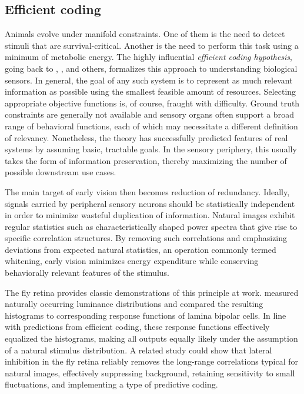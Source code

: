 \subsection{Efficient coding} Animals evolve under manifold constraints. One of them is the need to detect stimuli that are survival-critical. Another is the need to perform this task using a minimum of metabolic energy. The highly influential \textit{efficient coding hypothesis}, going back to \citet{Attneave:1954aa}, \citet{Barlow:1961aa}, and others, formalizes this approach to understanding biological sensors. In general, the goal of any such system is to represent as much relevant information as possible using the smallest feasible amount of resources. Selecting appropriate objective functions is, of course, fraught with difficulty. Ground truth constraints are generally not available and sensory organs often support a broad range of behavioral functions, each of which may necessitate a different definition of relevancy. Nonetheless, the theory has successfully predicted features of real systems by assuming basic, tractable goals. In the sensory periphery, this usually takes the form of information preservation, thereby maximizing the number of possible downstream use cases.

The main target of early vision then becomes reduction of redundancy. Ideally, signals carried by peripheral sensory neurons should be statistically independent in order to minimize wasteful duplication of information. Natural images exhibit regular statistics such as characteristically shaped power spectra that give rise to specific correlation structures. By removing such correlations and emphasizing deviations from expected natural statistics, an operation commonly termed whitening, early vision minimizes energy expenditure while conserving behaviorally relevant features of the stimulus.

The fly retina provides classic demonstrations of this principle at work. \citet{Laughlin:1981wn} measured naturally occurring luminance distributions and compared the resulting histograms to corresponding response functions of lamina bipolar cells. In line with predictions from efficient coding, these response functions effectively equalized the histograms, making all outputs equally likely under the assumption of a natural stimulus distribution. A related study \citep{Srinivasan:1982uq} could show that lateral inhibition in the fly retina reliably removes the long-range correlations typical for natural images, effectively suppressing background, retaining sensitivity to small fluctuations, and implementing a type of predictive coding.

